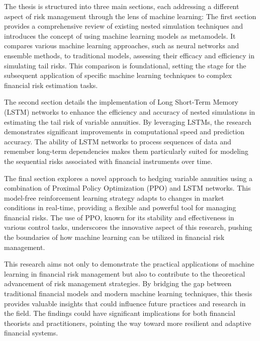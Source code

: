 The thesis is structured into three main sections, each addressing a different aspect of risk management through the lens of machine learning: The first section provides a comprehensive review of existing nested simulation techniques and introduces the concept of using machine learning models as metamodels. It compares various machine learning approaches, such as neural networks and ensemble methods, to traditional models, assessing their efficacy and efficiency in simulating tail risks. This comparison is foundational, setting the stage for the subsequent application of specific machine learning techniques to complex financial risk estimation tasks.

The second section details the implementation of Long Short-Term Memory (LSTM) networks to enhance the efficiency and accuracy of nested simulations in estimating the tail risk of variable annuities. By leveraging LSTMs, the research demonstrates significant improvements in computational speed and prediction accuracy. The ability of LSTM networks to process sequences of data and remember long-term dependencies makes them particularly suited for modeling the sequential risks associated with financial instruments over time.

The final section explores a novel approach to hedging variable annuities using a combination of Proximal Policy Optimization (PPO) and LSTM networks. This model-free reinforcement learning strategy adapts to changes in market conditions in real-time, providing a flexible and powerful tool for managing financial risks. The use of PPO, known for its stability and effectiveness in various control tasks, underscores the innovative aspect of this research, pushing the boundaries of how machine learning can be utilized in financial risk management.

This research aims not only to demonstrate the practical applications of machine learning in financial risk management but also to contribute to the theoretical advancement of risk management strategies. By bridging the gap between traditional financial models and modern machine learning techniques, this thesis provides valuable insights that could influence future practices and research in the field. The findings could have significant implications for both financial theorists and practitioners, pointing the way toward more resilient and adaptive financial systems.
